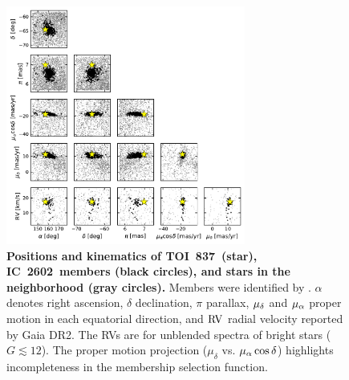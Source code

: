 \documentclass[12pt,twocolumn,tighten]{aastex63}
\newcommand{\tn}{TOI~837} %
\newcommand{\cn}{IC~2602} %
\begin{document}
\begin{figure}[!t]
	\begin{center}
		\leavevmode
		\includegraphics[width=0.7\textwidth]{f8.pdf}
	\end{center}
	\vspace{-0.7cm}
	\caption{ 
  {\bf Positions and kinematics of \tn\ (star), \cn\ members (black
  circles), and stars in the neighborhood (gray circles).} Members
  were identified by \citet{cantatgaudin_gaia_2018}.  $\alpha$ denotes
  right ascension, $\delta$ declination, $\pi$ parallax, $\mu_{\rm
  \delta}$ and $\mu_{\rm \alpha}$ proper motion in each equatorial
  direction, and ${\rm RV}$ radial velocity reported by Gaia DR2.  The
  RVs are for unblended spectra of bright stars ($G\lesssim 12$).  The
  proper motion projection ($\mu_{\delta}$ vs{.} $\mu_{\rm
  \alpha}\cos\delta$) highlights incompleteness in the membership selection function.
  \label{fig:full_kinematics}
	}
\end{figure}
\end{document}
